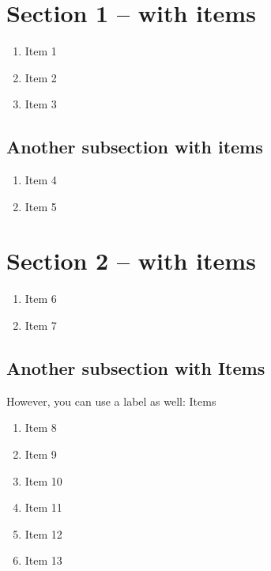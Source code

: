 \documentclass{article}
\begin{document}
\tableofcontents

\section{Section 1 -- with  items} 
    \begin{enumerate}[resume]
        \item Item 1
        \item Item 2
        \item Item 3
    \end{enumerate}

\subsection{Another subsection with  items}

\begin{enumerate}[resume]
\item Item 4
\item Item 5
\end{enumerate}


\section{Section 2 -- with  items}
\begin{enumerate}[resume]
\item Item 6
\item Item 7
\end{enumerate}

\subsection{Another subsection with  Items } 


However, you can use a label as well:  Items

\begin{enumerate}[resume]
\item Item 8
\item Item 9
\item Item 10
\item Item 11
\item Item 12
\item Item 13
\end{enumerate}
\end{document}
